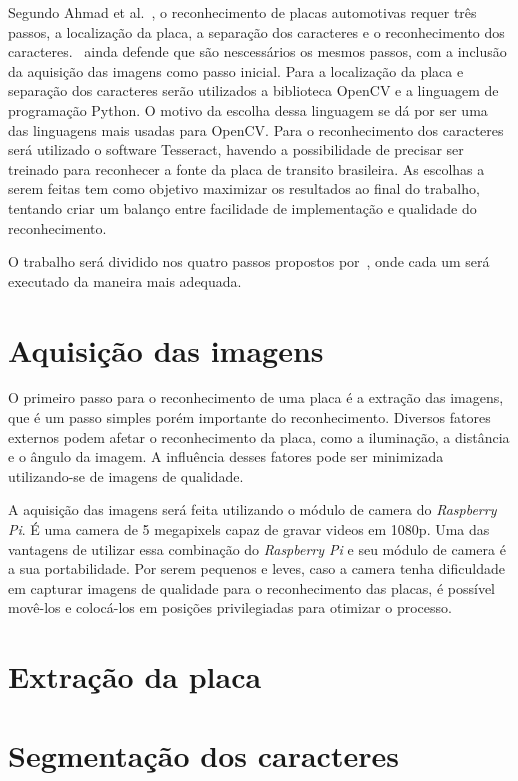 Segundo Ahmad et al.~\cite{ahmad2015automatic}, o reconhecimento de placas
automotivas requer três passos, a localização da placa, a separação dos
caracteres e o reconhecimento dos caracteres.~\cite{s2013automatic} ainda defende que são nescessários os mesmos passos, com a inclusão da aquisição das imagens como passo inicial. Para a localização da placa e
separação dos caracteres serão utilizados a biblioteca OpenCV e a linguagem de
programação Python. O motivo da escolha dessa linguagem se dá por
ser uma das linguagens mais usadas para OpenCV. Para o reconhecimento dos caracteres será utilizado o software Tesseract, havendo a possibilidade de precisar ser treinado para reconhecer a fonte da placa de transito brasileira. As escolhas a serem
feitas tem como objetivo maximizar os resultados ao final do trabalho, tentando
criar um balanço entre facilidade de implementação e qualidade do
reconhecimento.

O trabalho será dividido nos quatro passos propostos por~\cite{s2013automatic}, onde cada um será 
executado da maneira mais adequada.

\section{Aquisição das imagens}
\label{sec:aquisicao}

O primeiro passo para o reconhecimento de uma placa é a extração das imagens, que é um passo simples 
porém importante do reconhecimento. Diversos fatores externos podem afetar o reconhecimento da placa, 
como a iluminação, a distância e o ângulo da imagem. A influência desses fatores pode ser minimizada 
utilizando-se de imagens de qualidade.

A aquisição das imagens será feita utilizando o módulo de camera do \emph{Raspberry Pi}. É uma camera de 
5 megapixels capaz de gravar videos em 1080p. Uma das vantagens de utilizar essa combinação do \emph{Raspberry Pi} 
e seu módulo de camera é a sua portabilidade. Por serem pequenos e leves, caso a camera tenha dificuldade em 
capturar imagens de qualidade para o reconhecimento das placas, é possível movê-los e colocá-los em posições 
privilegiadas para otimizar o processo.

\section{Extração da placa}
\label{sec:extracao}

\section{Segmentação dos caracteres}
\label{sec:segmentacao}

